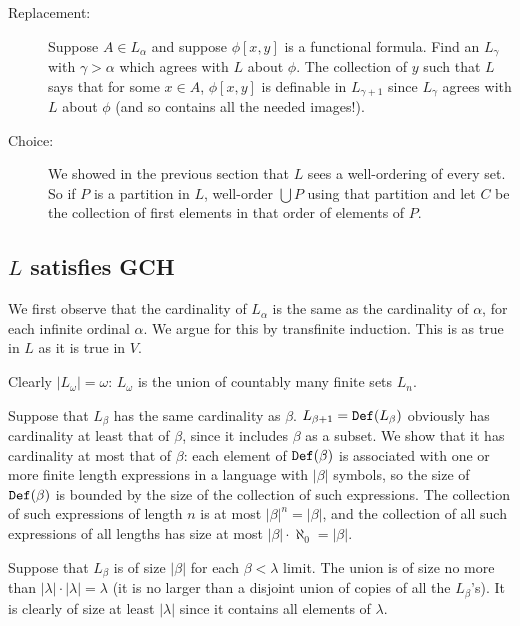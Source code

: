 \documentclass[12pt]{book}
\begin{document}
\begin{description}
\item[Replacement:]  Suppose $A \in L_{\alpha}$ and suppose $\phi[x,y]$ is a functional formula.  Find an $L_{\gamma}$ with $\gamma>\alpha$ which agrees with $L$ about
$\phi$.  The collection of $y$ such that $L$ says that for some $x \in A$, $\phi[x,y]$ is definable in $L_{\gamma+1}$ since $L_{\gamma}$ agrees with $L$ about $\phi$ (and so contains all the needed images!).

\item[Choice:]  We showed in the previous section that $L$ sees a well-ordering of every set.  So if $P$ is a partition in $L$, well-order $\bigcup P$ using that partition and let $C$ be the collection of first elements in that order of elements of $P$.

\end{description}

\newpage

\subsection{$L$ satisfies GCH}

We first observe that the cardinality of $L_{\alpha}$ is the same as the cardinality of $\alpha$, for each infinite ordinal $\alpha$.  We argue for this by transfinite induction.  This is as true in $L$ as it is true in $V$.

Clearly $|L_{\omega}| = \omega$:  $L_{\omega}$ is the union of countably many finite sets $L_n$.

Suppose that $L_{\beta}$ has the same cardinality as $\beta$.  $L_{\beta+1}={\tt Def}(L_{\beta})$ obviously has cardinality at least that of $\beta$, since it includes $\beta$ as a subset.   We show that it has cardinality 
at most that of $\beta$:  each element of ${\tt Def}(\beta)$ is associated with one or more finite length expressions in a language with $|\beta|$ symbols, so the size of ${\tt Def}(\beta)$ is bounded by the size of the collection of such expressions.  The collection of such expressions of length $n$ is at most $|\beta|^n=|\beta|$, and the collection of all such expressions of all lengths has size at most $|\beta| \cdot \aleph_0=|\beta|$.

Suppose that $L_{\beta}$ is of size $|\beta|$ for each $\beta<\lambda$ limit.  The union is of size no more than $|\lambda| \cdot |\lambda|=\lambda$ (it is no larger than a disjoint union of 
copies of all the $L_{\beta}$'s).  It is clearly of size at least $|\lambda|$ since it contains all elements of $\lambda$.
\end{document}
